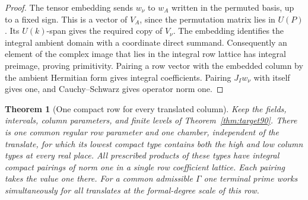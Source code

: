 \documentclass[a4paper,11pt]{article}
\newtheorem{theorem}[proposition]{Theorem}
\theoremstyle{definition}
\theoremstyle{remark}
\numberwithin{equation}{section}
\begin{document}
\begin{proof}
The tensor embedding sends \(w_\nu\) to \(w_A\) written in the
permuted basis, up to a fixed sign. This is a vector of \(V_A\),
since the permutation matrix lies in \(U(P)\). Its \(U(k)\)-span
gives the required copy of \(V_\nu\). The embedding identifies
the integral ambient domain with a coordinate direct summand.
Consequently an element of the complex image that lies in the
integral row lattice has integral preimage, proving primitivity.
Pairing a row vector with the embedded column by the ambient
Hermitian form gives integral coefficients. Pairing \(J_Iw_\nu\)
with itself gives one, and Cauchy--Schwarz gives operator norm one.
\end{proof}

\begin{theorem}[One compact row for every translated column]\label{thm:pair107}
Keep the fields, intervals, column parameters, and finite levels
of Theorem~\ref{thm:target90}. There is one common regular row
parameter and one chamber, independent of the translate, for
which its lowest compact type contains both the high and low
column types at every real place. All prescribed products of
these types have integral compact pairings of norm one in a
single row coefficient lattice. Each pairing takes the value
one there. For a common admissible \(\Gamma\) one terminal prime
works simultaneously for all translates at the formal-degree
scale of this row.
\end{theorem}
\end{document}
